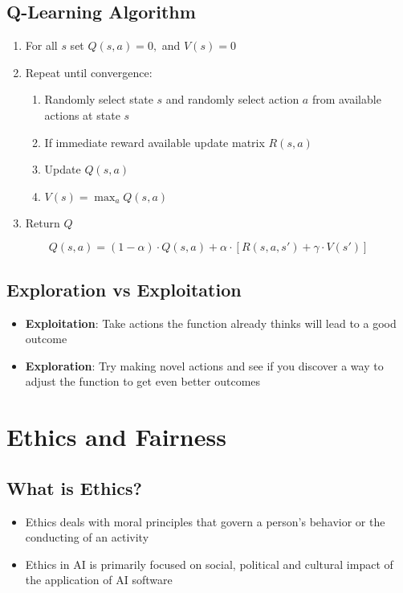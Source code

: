 \documentclass[11pt]{article}
\begin{document}
\subsection{Q-Learning Algorithm }
\begin{enumerate}
\item For all $s$ set $ Q(s,a) = 0,$ and $V(s) = 0$
\item Repeat until convergence:
\begin{enumerate}
\item Randomly select state $s$ and randomly select action $a$ from available actions at state $s$
\item If immediate reward available update matrix $R(s,a)$
\item Update $Q(s,a)$
\item $V(s) = \max_a Q(s,a)$
\end{enumerate}
\item Return $Q$
\end{enumerate}
$$ Q(s,a) =(1-\alpha)\cdot Q(s,a) + \alpha \cdot [R(s,a,s')+ \gamma \cdot V(s')]$$

\subsection{Exploration vs Exploitation}
\begin{itemize}
\item \textbf{Exploitation}: Take actions the function already thinks will lead to a good outcome
\item \textbf{Exploration}: Try making novel actions and see if you discover a way to adjust the function to get even better outcomes
\end{itemize}



\pagebreak

\section{Ethics and Fairness}
\subsection{What is Ethics?}
\begin{itemize}
\item Ethics deals with moral principles that govern a person's behavior or the conducting of an activity
\item Ethics in AI is primarily focused on social, political and cultural impact of the application of AI software
\end{itemize}
\end{document}
